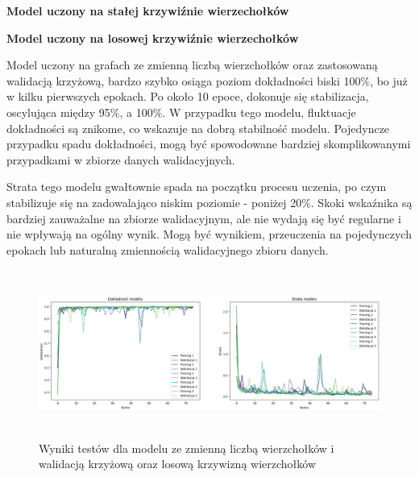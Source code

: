 \textbf{Model uczony na stałej krzywiźnie wierzechołków}



\textbf{Model uczony na losowej krzywiźnie wierzechołków}

Model uczony na grafach ze zmienną liczbą wierzchołków oraz zastosowaną walidacją krzyżową,
bardzo szybko osiąga poziom dokładności biski 100\%, bo już w kilku pierwszych epokach.
Po około 10 epoce, dokonuje się stabilizacja, oscylująca między 95\%, a 100\%.
W przypadku tego modelu, fluktuacje dokładności są znikome, co wskazuje na dobrą stabilność modelu.
Pojedyncze przypadku spadu dokładności, mogą być spowodowane bardziej skomplikowanymi
przypadkami w zbiorze danych walidacyjnych.

Strata tego modelu gwałtownie spada na początku procesu uczenia,
po czym stabilizuje się na zadowalająco niskim poziomie - poniżej 20\%.
Skoki wskaźnika są bardziej zauważalne na zbiorze walidacyjnym,
ale nie wydają się być regularne i nie wpływają na ogólny wynik.
Mogą być wynikiem, przeuczenia na pojedynczych epokach lub naturalną zmiennością walidacyjnego zbioru danych.

\begin{figure}[ht]
	\centering
	\includegraphics[height=5.5cm]{resources/tests/images/v3/multiple_edges_crossvalid_img.png}
	\caption{Wyniki testów dla modelu ze zmienną liczbą wierzchołków i walidacją krzyżową oraz losową krzywizną wierzchołków}
	\label{Fig:tests-csvar-1}
\end{figure}
\FloatBarrier

